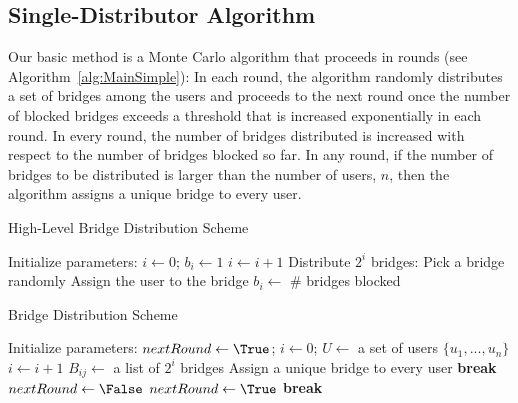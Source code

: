 \subsection{Single-Distributor Algorithm}
Our basic method is a Monte Carlo algorithm that proceeds in rounds (see \mbox{Algorithm~\ref{alg:MainSimple}}): In each round, the algorithm randomly distributes a set of bridges among the users and proceeds to the next round once the number of blocked bridges exceeds a threshold that is increased exponentially in each round. In every round, the number of bridges distributed is increased with respect to the number of bridges blocked so far. In any round, if the number of bridges to be distributed is larger than the number of users, $n$, then the algorithm assigns a unique bridge to every user.

\begin{algorithm}[t]
	\caption{High-Level Bridge Distribution Scheme}
	\label{alg:MainSimpleShort}
	
	\algFont \vspace{2pt}
	\begin{algorithmic}[1]
		\State Initialize parameters: ${i \gets 0}$; ${b_i \gets 1}$
		\While{\True}
			 \label{ln:ConditionSimple}
				\State $i \gets i+1$ \label{ln:IncrementSimple}
				\State Distribute $2^i$ bridges: \label{ln:DistributeSimple}
				\Indent
					\therule {}
						\State Pick a bridge randomly
						\State Assign the user to the bridge
					\EndFor
				\EndIndent
			\EndIf
			\State $b_i \gets$ \# bridges blocked
		\EndWhile
	\end{algorithmic}
\end{algorithm}


\begin{algorithm}[t]
	\caption{Bridge Distribution Scheme}
	\label{alg:MainSimple}
	
	\algFont \vspace{2pt}
	\begin{algorithmic}[1]
		\State Initialize parameters: ${nextRound \gets \True}$; ${i \gets 0}$; $U \gets$ a set of users ${\{u_1,...,u_n\}}$
		\While{\True}
			 \label{ln:ConditionSimple}
				\State $i \gets i+1$ \label{ln:IncrementSimple}
						\State $B_{ij} \gets$ a list of $2^i$ bridges
						\State {} \label{ln:DistributeSimple}
					\EndFor
				\Else
					\State Assign a unique bridge to every user
					\State \textbf{break}
				\EndIf
				\State $nextRound \gets \False$
			\EndIf
					\State $nextRound \gets \True$
					\State \textbf{break}
				\EndIf 
			\EndFor
		\EndWhile
	\end{algorithmic}
\end{algorithm}

